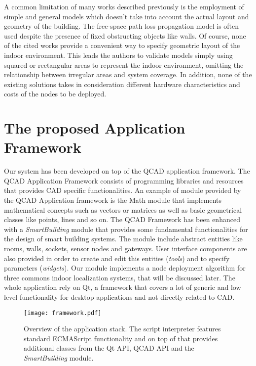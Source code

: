 A common limitation of many works described previously is the employment of simple and general models which doesn't take into account the actual layout and geometry of the building. The free-space path loss propagation model is often used despite the presence of fixed obstructing objects like walls. Of course, none of the cited works provide a convenient way to specify geometric layout of the indoor environment. This leads the authors to validate models simply using squared or rectangular areas to represent the indoor environment, omitting the relationship between irregular areas and system coverage.
In addition, none of the existing solutions takes in consideration different hardware characteristics and costs of the nodes to be deployed.

\section{The proposed Application Framework}\label{sec:components}
Our system has been developed on top of the QCAD application framework. The QCAD Application Framework consists of programming libraries and resources that provides CAD specific functionalities. An example of module provided by the QCAD Application framework is the Math module that implements mathematical concepts such as vectors or matrices as well as basic geometrical classes like points, lines and so on. The QCAD Framework has been enhanced with a \emph{SmartBuilding} module that provides some fundamental functionalities for the design of smart building systems. The module include abstract entities like rooms, walls, sockets, sensor nodes and gateways. User interface components are also provided in order to create and edit this entities (\emph{tools}) and to specify parameters (\emph{widgets}). Our module implements a node deployment algorithm for three commons indoor localization systems, that will be discussed later.
The whole application rely on Qt, a framework that covers a lot of generic and low level functionality for desktop applications and not directly related to CAD.
\begin{figure}[h!tb]
\centering\texttt{[image: framework.pdf]}
\caption[Overview of the CAD application framework stack.]{Overview of the application stack. The script interpreter features standard ECMAScript functionality and on top of that provides additional classes from the Qt API, QCAD API and the \emph{SmartBuilding} module.}
\end{figure}

